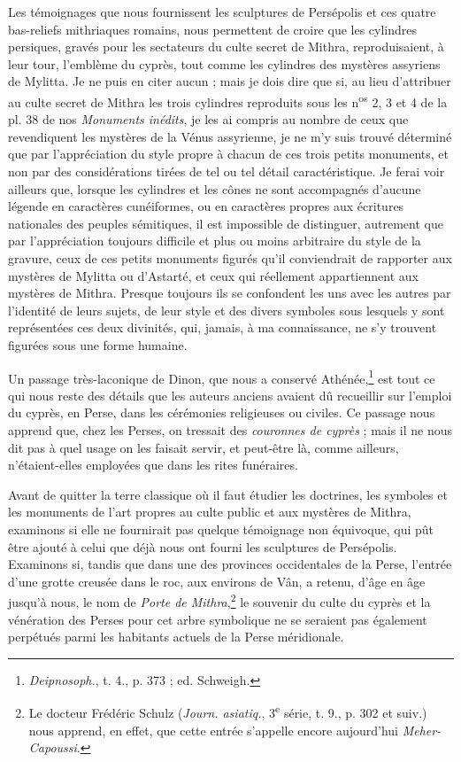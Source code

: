 \documentclass[a4paper, 11pt, oneside, polutonikogreek, french]{article}
\begin{document}
Les témoignages que nous fournissent les sculptures de Persépolis et ces quatre bas-reliefs mithriaques romains, nous permettent de croire que les cylindres persiques, gravés pour les sectateurs du culte secret de Mithra, reproduisaient, à leur tour, l'emblème du cyprès, tout comme les cylindres des mystères assyriens de Mylitta. Je ne puis en citer aucun ; mais je dois dire que si, au lieu d'attribuer au culte secret de Mithra les trois cylindres reproduits sous les n\textsuperscript{os} 2, 3 et 4 de la pl. 38 de nos \emph{Monuments inédits}, je les ai compris au nombre de ceux que revendiquent les mystères de la Vénus assyrienne, je ne m'y suis trouvé déterminé que par l'appréciation du style propre à chacun de ces trois petits monuments, et non par des considérations tirées de tel ou tel détail caractéristique. Je ferai voir ailleurs que, lorsque les cylindres et les cônes ne sont accompagnés d'aucune légende en caractères cunéiformes, ou en caractères propres aux écritures nationales des peuples sémitiques, il est impossible de distinguer, autrement que par l'appréciation toujours difficile et plus ou moins arbitraire du style de la gravure, ceux de ces petits monuments figurés qu'il conviendrait de rapporter aux mystères de Mylitta ou d'Astarté, et ceux qui réellement appartiennent aux mystères de Mithra. Presque toujours ils se confondent les uns avec les autres par l'identité de leurs sujets, de leur style et des divers symboles sous lesquels y sont représentées ces deux divinités, qui, jamais, à ma connaissance, ne s'y trouvent figurées sous une forme humaine.

Un passage très-laconique de Dinon, que nous a conservé Athénée,\footnote{\emph{Deipnosoph.}, t. 4., p. 373 ; ed. Schweigh.} est tout ce qui nous reste des détails que les auteurs anciens avaient dû recueillir sur l'emploi du cyprès, en Perse, dans les cérémonies religieuses ou civiles. Ce passage nous apprend que, chez les Perses, on tressait des \emph{couronnes de cyprès} ; mais il ne nous dit pas à quel usage on les faisait servir, et peut-être là, comme ailleurs, n'étaient-elles employées que dans les rites funéraires.

Avant de quitter la terre classique où il faut étudier les doctrines, les symboles et les monuments de l'art propres au culte public et aux mystères de Mithra, examinons si elle ne fournirait pas quelque témoignage non équivoque, qui pût être ajouté à celui que déjà nous ont fourni les sculptures de Persépolis. Examinons si, tandis que dans une des provinces occidentales de la Perse, l'entrée d'une grotte creusée dans le roc, aux environs de Vân, a retenu, d'âge en âge jusqu'à nous, le nom de \emph{Porte de Mithra},\footnote{Le docteur Frédéric Schulz (\emph{Journ. asiatiq.}, 3\textsuperscript{e} série, t. 9., p. 302 et suiv.) nous apprend, en effet, que cette entrée s'appelle encore aujourd'hui \emph{Meher-Capoussi}.} le souvenir du culte du cyprès et la vénération des Perses pour cet arbre symbolique ne se seraient pas également perpétués parmi les habitants actuels de la Perse méridionale.
\end{document}
